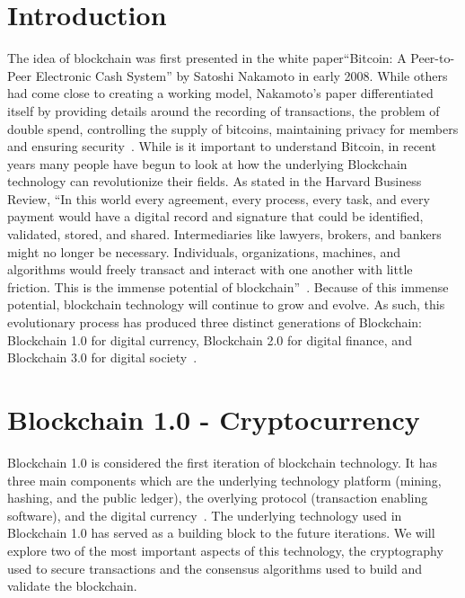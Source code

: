 \section{Introduction}
The idea of blockchain was first presented in the white paper``Bitcoin: A Peer-to-Peer Electronic Cash System'' by Satoshi Nakamoto in early 2008. While others had come close to creating a working model, Nakamoto's paper differentiated itself by providing details around the recording of transactions, the problem of double spend, controlling the supply of bitcoins, maintaining privacy for members and ensuring security~\cite{hid-sp18-414-www-blockchain-theory-application}. While is it important to understand Bitcoin, in recent years many people have begun to look at how the underlying Blockchain technology can revolutionize their fields.  As stated in the Harvard Business Review, ``In this world every agreement, every process, every task, and every payment would have a digital record and signature that could be identified, validated, stored, and shared. Intermediaries like lawyers, brokers, and bankers might no longer be necessary. Individuals, organizations, machines, and algorithms would freely transact and interact with one another with little friction. This is the immense potential of blockchain''~\cite{hid-sp18-414-Truth-Blockchain}. Because of this immense potential, blockchain technology will continue to grow and evolve.  As such, this evolutionary process has produced three distinct generations of Blockchain: Blockchain 1.0 for digital currency, Blockchain 2.0 for digital finance, and Blockchain 3.0 for digital society~\cite{hid-sp18-414-financialinnovation-zhao}.

\section{Blockchain 1.0 - Cryptocurrency}

Blockchain 1.0 is considered the first iteration of blockchain technology. It has three main components which are the underlying technology platform (mining, hashing, and the public ledger), the overlying protocol (transaction enabling software), and the digital currency~\cite{hid-sp18-414-www-promise-bitcoin-blockchain}. The underlying technology used in Blockchain 1.0 has served as a building block to the future iterations. We will explore two of the most important aspects of this technology, the cryptography used to secure transactions and the consensus algorithms used to build and validate the blockchain. 

